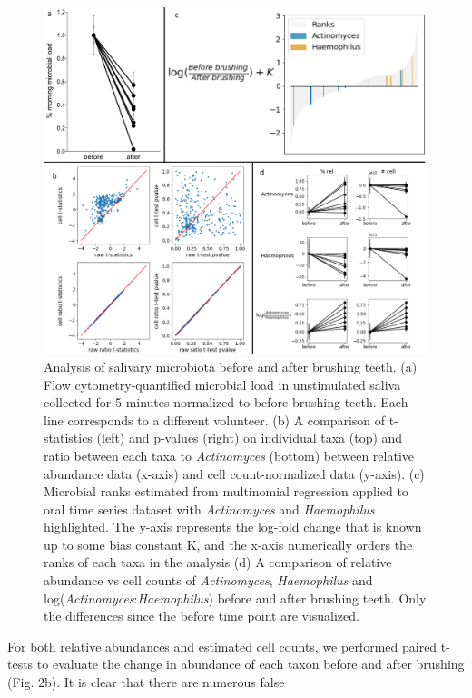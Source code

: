 \begin{figure}
  \includegraphics[width=1\textwidth]{ch4/Figure2.png}
  \caption[Comparison of absolute and relative abundance data using proportions, ratios and ranks on
    oral microbial communities.]{
    Analysis of salivary microbiota before and after brushing teeth. (a) Flow cytometry-quantified microbial
    load in unstimulated saliva collected for 5 minutes normalized to before brushing teeth. Each line corresponds
    to a different volunteer. (b) A comparison of t-statistics (left) and p-values (right) on individual taxa (top)
    and ratio between each taxa to \textit{Actinomyces} (bottom) between relative abundance data (x-axis) and cell
    count-normalized data (y-axis). (c) Microbial ranks estimated from multinomial regression applied to oral time
    series dataset with \textit{Actinomyces} and \textit{Haemophilus} highlighted.  The y-axis represents the log-fold change that is
    known up to some bias constant K, and the x-axis numerically orders the ranks of each taxa in the analysis
    (d) A comparison of relative abundance vs cell counts of \textit{Actinomyces}, \textit{Haemophilus} and log(\textit{Actinomyces}:\textit{Haemophilus})
    before and after brushing teeth. Only the differences since the before time point are visualized.}
\end{figure}
%
For both relative abundances and estimated cell counts, we performed paired t-tests to evaluate the change
in abundance of each taxon before and after brushing (Fig. 2b). It is clear that there are numerous false

